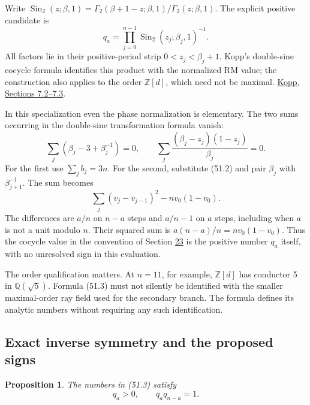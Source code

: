 \documentclass[11pt,reqno]{amsart}
\theoremstyle{plain}
\newtheorem{proposition}[theorem]{Proposition}
\begin{document}
Write
\(\operatorname{Sin}_2(z;\beta,1)=
\Gamma_2(\beta+1-z;\beta,1)/\Gamma_2(z;\beta,1)\).
The explicit positive candidate is
\begin{equation*}
 \boxed{\displaystyle
 q_a=\prod_{j=0}^{n-1}\operatorname{Sin}_2(z_j;\beta_j,1)^{-1}.
 }\tag{51.3}
\end{equation*}
All factors lie in their positive-period strip \(0<z_j<\beta_j+1\).
Kopp's double-sine cocycle formula identifies this product with the
normalized RM value; the construction also applies to the order
\(\mathbb Z[d]\), which need not be maximal.
\href{https://arxiv.org/html/2411.06763v2\#S7.SS2}{Kopp, Sections 7.2--7.3}.

In this specialization even the phase normalization is elementary.
The two sums occurring in the double-sine transformation formula vanish:
\begin{equation*}
 \sum_j(\beta_j-3+\beta_j^{-1})=0,\qquad
 \sum_j\frac{(\beta_j-z_j)(1-z_j)}{\beta_j}=0.
 \tag{51.4}
\end{equation*}
For the first use \(\sum_jb_j=3n\). For the second, substitute (51.2)
and pair \(\beta_j\) with \(\beta_{j+1}^{-1}\). The sum becomes
\[
 \sum_j(v_j-v_{j-1})^2-nv_0(1-v_0).
\]
The differences are \(a/n\) on \(n-a\) steps and \(a/n-1\) on
\(a\) steps, including when \(a\) is not a unit modulo \(n\).
Their squared sum is \(a(n-a)/n=nv_0(1-v_0)\). Thus the cocycle
value in the convention of Section \hyperref[sec:23]{23} is the positive number \(q_a\)
itself, with no unresolved sign in this evaluation.

The order qualification matters. At \(n=11\), for example,
\(\mathbb Z[d]\) has conductor 5 in \(\mathbb Q(\sqrt5)\).
Formula (51.3) must not silently be identified with the smaller
maximal-order ray field used for the secondary branch. The formula
defines its analytic numbers without requiring any such identification.

\subsection{Exact inverse symmetry and the proposed signs}\label{sec:51.2}

\begin{proposition}
The numbers in (51.3) satisfy
\begin{equation*}
 q_a>0,\qquad q_aq_{n-a}=1.\tag{51.5}
\end{equation*}
\end{proposition}
\end{document}
